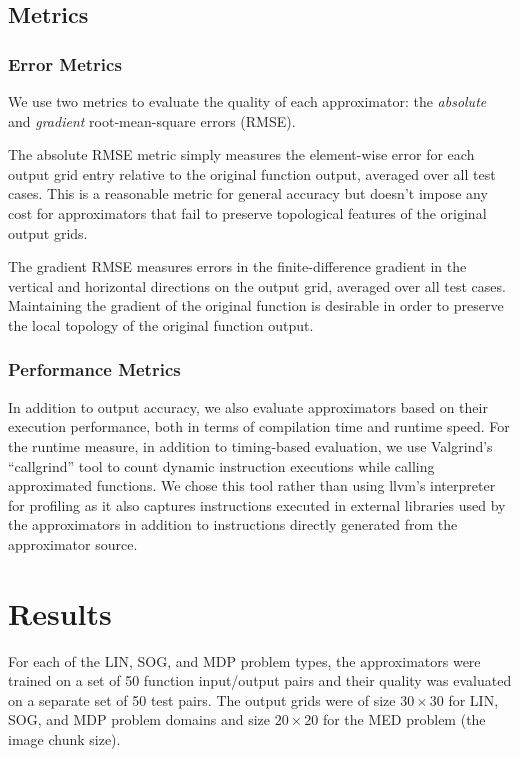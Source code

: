 \documentclass{article}
\begin{document}
\subsection{Metrics}

\subsubsection{Error Metrics}
We use two metrics to evaluate the quality of each approximator: the \textit{absolute} and \textit{gradient} root-mean-square errors (RMSE).

The absolute RMSE metric simply measures the element-wise error for each output grid entry relative to the original function output, averaged over all test cases. This is a reasonable metric for general accuracy but doesn't impose any cost for approximators that fail to preserve topological features of the original output grids.

The gradient RMSE measures errors in the finite-difference gradient in the vertical and horizontal directions on the output grid, averaged over all test cases. Maintaining the gradient of the original function is desirable in order to preserve the local topology of the original function output.
\subsubsection{Performance Metrics}
In addition to output accuracy, we also evaluate approximators based on their execution performance, both in terms of compilation time and runtime speed. For the runtime measure, in addition to timing-based evaluation, we use Valgrind's ``callgrind'' tool to count dynamic instruction executions while calling approximated functions. We chose this tool rather than using llvm's interpreter for profiling as it also captures instructions executed in external libraries used by the approximators in addition to instructions directly generated from the approximator source.

\section{Results}

For each of the LIN, SOG, and MDP problem types, the approximators were trained on a set of 50 function input/output pairs and their quality was evaluated on a separate set of 50 test pairs. The output grids were of size $30 \times 30$ for LIN, SOG, and MDP problem domains and size $20 \times 20$ for the MED problem (the image chunk size).
\end{document}
